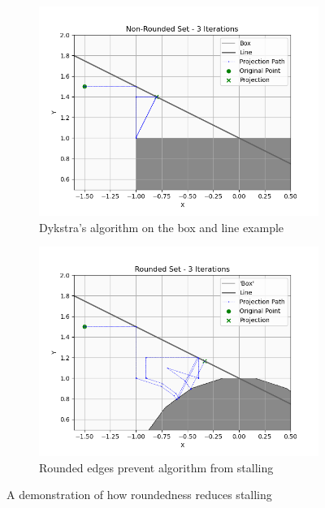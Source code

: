\documentclass[hidelinks]{article}
\begin{document}
\begin{figure}[h!]
    \centering
    
    \begin{subfigure}[t]{0.49\textwidth}
        \centering
        \includegraphics[width=1\textwidth]{non_rounded_test.png}
        \caption{Dykstra's algorithm on the box and line example}
        \label{fig:nonRounded}
    \end{subfigure}
    \hfill
    \begin{subfigure}[t]{0.49\textwidth}
        \centering
        \includegraphics[width=1\textwidth]{rounded_test.png}
        \caption{Rounded edges prevent algorithm from stalling}
        \label{fig:Rounded}
    \end{subfigure}
    \caption{A demonstration of how roundedness reduces stalling}
    \label{fig:stall}
\end{figure}
\end{document}
